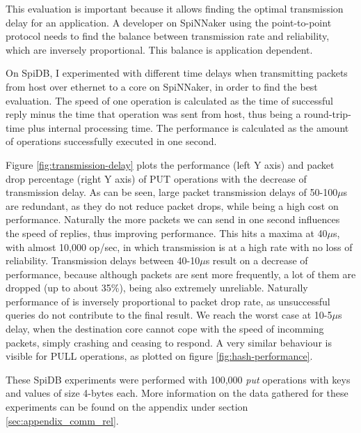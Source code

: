 This evaluation is important because it allows finding the optimal transmission delay for an application. A developer on SpiNNaker using the point-to-point protocol needs to find the balance between transmission rate and reliability, which are inversely proportional. This balance is application dependent.

On SpiDB, I experimented with different time delays when transmitting packets from host over ethernet to a core on SpiNNaker, in order to find the best evaluation. The speed of one operation is calculated as the time of successful reply minus the time that operation was sent from host, thus being a round-trip-time plus internal processing time. The performance is calculated as the amount of operations successfully executed in one second.

Figure \ref{fig:transmission-delay} plots the performance (left Y axis) and packet drop percentage (right Y axis) of PUT operations  with the decrease of transmission delay. As can be seen, large packet transmission delays of 50-100$\mu$s are redundant, as they do not reduce packet drops, while being a high cost on performance. Naturally the more packets we can send in one second influences the speed of replies, thus improving performance. This hits a maxima at 40$\mu$s, with almost 10,000 op/sec, in which transmission is at a high rate with no loss of reliability. Transmission delays between 40-10$\mu$s result on a decrease of performance, because although packets are sent more frequently, a lot of them are dropped (up to about 35\%), being also extremely unreliable. Naturally performance of is inversely proportional to packet drop rate, as unsuccessful queries do not contribute to the final result. We reach the worst case at 10-5$\mu$s delay, when the destination core cannot cope with the speed of incomming packets, simply crashing and ceasing to respond. A very similar behaviour is visible for PULL operations, as plotted on figure \ref{fig:hash-performance}.

These SpiDB experiments were performed with 100,000 \textit{put} operations with keys and values of size 4-bytes each. More information on the data gathered for these experiments can be found on the appendix under section \ref{sec:appendix_comm_rel}.

